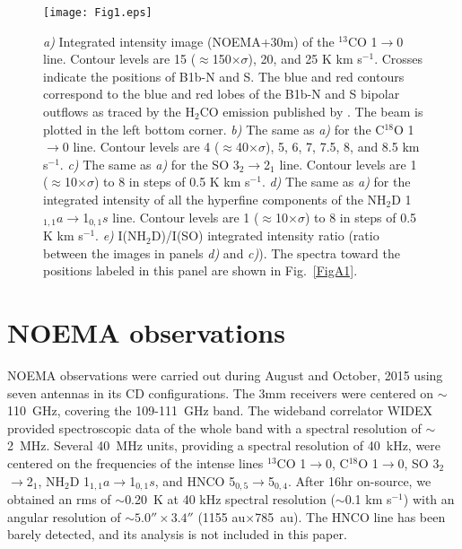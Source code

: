 \documentclass[letter]{aa}
\begin{document}
\begin{figure*}[t!]
\hspace{-0.0cm}\vspace{-1.0cm}\texttt{[image: Fig1.eps]}
\caption{{\em a)} Integrated intensity image (NOEMA+30m) of the $^{13}$CO 1$\rightarrow$0 line. Contour levels are 15 
($\approx$150$\times$$\sigma$), 20, and 25 K km s$^{-1}$. Crosses indicate the positions of B1b-N and S. 
The blue and red contours correspond to the blue and red lobes of the B1b-N and S
bipolar outflows as traced by the H$_2$CO emission published by \citet{Gerin15}. 
The beam is plotted in the left bottom corner. 
{\em b)} The same as {\em a)} for the C$^{18}$O 1$\rightarrow$0 line. 
Contour levels are 4 ($\approx$40$\times$$\sigma$), 5, 6, 7, 7.5, 8, and 8.5 km s$^{-1}$.
{\em c)} The same as {\em a)} for the SO 3$_2$$\rightarrow$2$_1$ line. Contour 
levels are 1 ($\approx$10$\times$$\sigma$) to 8 in steps of 0.5 K km s$^{-1}$.
{\em d)} The same as {\em a)} for the integrated intensity of
all the hyperfine components of the NH$_2$D  1$_{1,1}a$$\rightarrow$1$_{0,1}s$ line. Contour levels are 1 
($\approx$10$\times$$\sigma$) to 8 in steps of 0.5 K km s$^{-1}$. 
{\em e)} I(NH$_2$D)/I(SO) integrated intensity ratio (ratio between the images in panels {\em d)} and {\em c)}). 
The spectra toward the positions labeled in this panel are shown in Fig.~\ref{FigA1}. 
}
 \label{Fig1}
\end{figure*}



\section{NOEMA observations}

NOEMA observations were carried out during August and October, 2015 using seven antennas in its CD configurations.
The 3mm receivers were centered on $\sim$110~GHz, covering the 109-111~GHz band.
The wideband correlator WIDEX provided spectroscopic data of the whole band with
a spectral resolution of  $\sim$2~MHz. Several 40~MHz units, providing a spectral resolution of 40~kHz, were 
centered on the frequencies of the intense lines $^{13}$CO 1$\rightarrow$0, C$^{18}$O 1$\rightarrow$0, 
SO  3$_2$$\rightarrow$2$_1$, NH$_2$D 1$_{1,1}a$$\rightarrow$1$_{0,1}s$, and HNCO  5$_{0,5}$$\rightarrow$5$_{0,4}$. 
After 16hr on-source, we obtained an rms of $\sim$0.20~K at 40 kHz spectral resolution 
($\sim$0.1 km s$^{-1}$) 
with an angular resolution of $\sim$$5.0''\times3.4''$ (1155 au$\times$785~au). The HNCO line has 
been barely detected,
and its analysis is not included in this paper.
\end{document}

